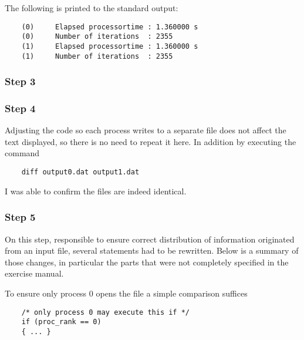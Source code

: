 The following is printed to the standard output:
\begin{lstlisting}
	(0)     Elapsed processortime : 1.360000 s
	(0)     Number of iterations  : 2355
	(1)     Elapsed processortime : 1.360000 s
	(1)     Number of iterations  : 2355
\end{lstlisting}

\subsubsection{Step 3}


\subsubsection{Step 4}

Adjusting the code so each process writes to a separate file does not affect the text displayed, so there is no need to repeat it here. In addition by executing the command

\begin{lstlisting}
	diff output0.dat output1.dat
\end{lstlisting}

I was able to confirm the files are indeed identical.

\subsubsection{Step 5}

On this step, responsible to ensure correct distribution of information originated from an input file, several statements had to be rewritten. Below is a summary of those changes, in particular the parts that were not completely specified in the exercise manual.

To ensure only process 0 opens the file a simple comparison suffices
\begin{lstlisting}
	/* only process 0 may execute this if */
	if (proc_rank == 0)
	{ ... }
\end{lstlisting}

